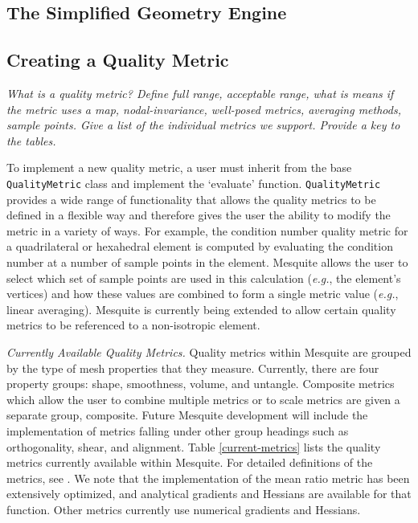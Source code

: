 \documentclass[psfig]{article}
\begin{document}
\subsection{The Simplified Geometry Engine}

\subsection{Creating a Quality Metric}

{\it 
What is a quality metric? Define full range, acceptable range, what is means 
if the metric uses a map, nodal-invariance, well-posed metrics, averaging 
methods, sample points. Give a list of the individual metrics we support. 
Provide a key to the tables.
}

To implement a new quality metric, a user must inherit from the base
{\tt QualityMetric} class and implement the `evaluate' function.
{\tt QualityMetric} provides a wide range of
functionality that allows the quality metrics to be defined in a
flexible way and therefore gives the user the ability to modify the
metric in a variety of ways.  For example, the condition number
quality metric for a quadrilateral or hexahedral element is computed
by evaluating the condition number at a number of sample points in the
element.  Mesquite allows the user to select which set of sample
points are used in this calculation ({\it e.g.}, the element's
vertices) and how these values are combined to form a single metric
value ({\it e.g.}, linear averaging).  Mesquite is currently being
extended to allow certain quality metrics to be referenced to a
non-isotropic element.

{\it Currently Available Quality Metrics.}  Quality metrics within
Mesquite are grouped by the type of mesh properties that they measure.
Currently, there are four property groups: shape, smoothness, volume,
and untangle.  Composite metrics which allow the user to combine
multiple metrics or to scale metrics are given a separate group,
composite.  Future Mesquite development will include the
implementation of metrics falling under other group headings such as
orthogonality, shear, and alignment.  Table \ref{current-metrics}
lists the quality metrics currently available within Mesquite.  For
detailed definitions of the metrics, see \cite{Kn01}.  We note that
the implementation of the mean ratio metric has been extensively
optimized, and analytical gradients and Hessians are available for
that function.  Other metrics currently use numerical gradients and
Hessians.
\end{document}
